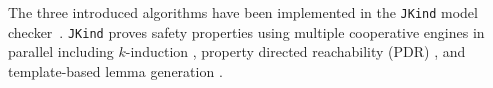 %
%
%
The three introduced algorithms have been implemented in the \texttt{JKind} model checker~\cite{jkind}. %
\texttt{JKind} proves safety properties using multiple cooperative engines in parallel including $k$-induction \cite{SheeranSS00}, property directed reachability (PDR) \cite{Een2011:PDR}, and template-based lemma generation \cite{Kahsai2011}. %

